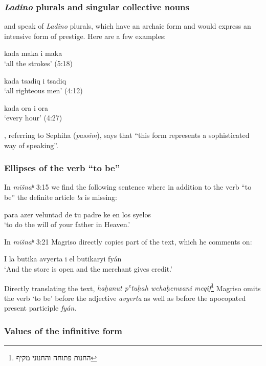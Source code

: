 \documentclass[output=paper,colorlinks,citecolor=brown,babel,arabicfont]{langscibook}
\begin{document}
\subsubsection{\textit{Ladino} plurals and singular collective nouns}\label{ch3.7.ss.3.3.3}

\citet[65--66]{sephiha1973} and \citet[210]{bornes-varol2008} speak of \textit{Ladino} plurals, which have an archaic form and would express an intensive form of prestige. Here are a few examples:

\ea\label{ch3.7.ex.n40}
kada maka i maka \\
`all the strokes' (5:18) 
\z

\ea\label{ch3.7.ex.n41}
kada tsadiq i tsadiq \\
`all righteous men' (4:12) 
\z

\ea\label{ch3.7.ex.n42}
kada ora  i ora \\
`every hour' (4:27) 
\z

\citet[210]{bornes-varol2008}, referring to Sephiha (\textit{passim}), says that ``this form represents a sophisticated way of speaking''. 

\subsubsection{Ellipses of the verb ``to be''}\label{ch3.7.ss.3.3.4}

In \textit{mišnaʰ} 3:15 we find the following sentence where in addition to the verb ``to be'' the definite article \textit{la} is missing: 

\ea\label{ch3.7.ex.n43}
para azer veluntad de tu padre  ke en los syelos \\
`to do the will of your father in Heaven.'
\z

In \textit{mišnaʰ} 3:21 Magriso directly copies part of the  text, which he comments on: 

\ea\label{ch3.7.ex.n44}
I la butika avyerta i  el butikaryi fyán \\
`And the store is open and the merchant gives credit.'
\z

Directly translating the  text, \textit{haḥanut p\textsuperscript{e}tuḥah wehaḥenwani meqif}\footnote{\texthebrew{החנות פתוחה והחנוני מקיף}} Magriso omits the verb `to be' before the adjective \textit{avyerta} as well as before the apocopated present participle \textit{fyán}. 

\subsubsection{Values of the infinitive form}\label{ch3.7.ss.3.3.5}
\end{document}
